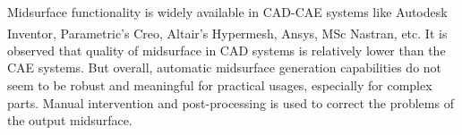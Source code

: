 Midsurface functionality is widely available in CAD-CAE systems like Autodesk Inventor\textsuperscript{\textregistered}, Parametric's Creo,  Altair's Hypermesh\textsuperscript{\textregistered}, Ansys\textsuperscript{\textregistered}, MSc Nastran\textsuperscript{\textregistered}, etc. It is observed that quality of midsurface in CAD systems is relatively lower than the CAE systems. But overall, automatic midsurface generation capabilities do not seem to be robust and meaningful for practical usages, especially for complex parts. Manual intervention and post-processing is used to correct the problems of the output midsurface.



\def \myfigcommcolumnwidth{0.85}

